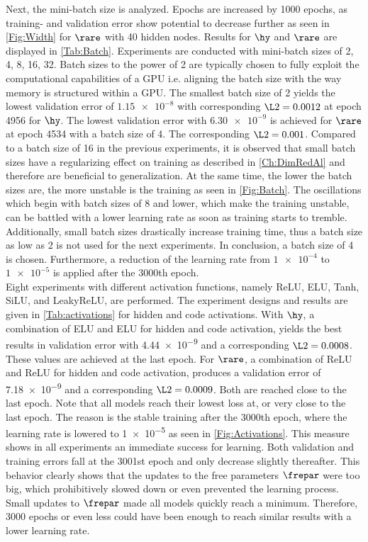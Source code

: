 Next, the mini-batch size is analyzed. Epochs are increased by 1000 epochs, as training- and validation error show potential to decrease further as seen in \cref{Fig:Width} for \(\rare\) with 40 hidden nodes. Results for $\hy$  and  $\rare$ are displayed in \cref{Tab:Batch}. Experiments are conducted with mini-batch sizes of 2, 4, 8, 16, 32. Batch sizes to the power of 2 are typically chosen to fully exploit the computational capabilities of a GPU i.e. aligning the batch size with the way memory is structured within a GPU. The smallest batch size of 2 yields the lowest validation error of \(\num{1.15e-8}\) with corresponding \(\L2 = 0.0012\) at epoch 4956 for \(\hy\). The lowest validation error with \(\num{6.30e-9}\) is achieved for \(\rare\) at epoch 4534 with a batch size of 4. The corresponding \(\L2 = 0.001\). Compared to a batch size of 16 in the previous experiments, it is observed that small batch sizes have a regularizing effect on training as described in \cref{Ch:DimRedAl} and therefore are beneficial to generalization. At the same time, the lower the batch sizes are, the more unstable is the training as seen in \cref{Fig:Batch}. The oscillations which begin with batch sizes of 8 and lower, which make the training unstable, can be battled with a lower learning rate as soon as training starts to tremble. Additionally, small batch sizes drastically increase training time, thus a batch size as low as 2 is not used for the next experiments. In conclusion, a batch size of 4 is chosen. Furthermore, a reduction of the learning rate from \(\num{1e-4}\) to \(\num{1e-5}\) is applied after the 3000th epoch.\\

Eight experiments with different activation functions, namely ReLU, ELU, Tanh, SiLU, and LeakyReLU, are performed. The experiment designs and results are given in \cref{Tab:activations} for hidden and code activations. With \(\hy\), a combination of ELU and ELU for hidden and code activation, yields the best results in validation error with \num{4.44e-9} and a corresponding \(\L2 = 0.0008\). These values are achieved at the last epoch. For \(\rare\), a combination of ReLU and ReLU for hidden and code activation, produces a validation error of \num{7.18e-9} and a corresponding \(\L2 = 0.0009\). Both are reached close to the last epoch. Note that all models reach their lowest loss at, or very close to the last epoch. The reason is the stable training after the 3000th epoch, where the learning rate is lowered to \num{1e-5} as seen in \cref{Fig:Activations}. This measure shows in all experiments an immediate success for learning. Both validation and training errors fall at the 3001st epoch and only decrease slightly thereafter. This behavior clearly shows that the updates to the free parameters \(\frepar\) were too big, which prohibitively slowed down or even prevented the learning process. Small updates to \(\frepar\) made all models quickly reach a minimum. Therefore, 3000 epochs or even less could have been enough to reach similar results with a lower learning rate.\\

